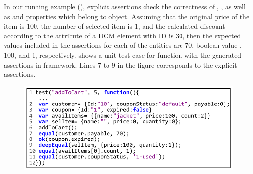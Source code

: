 In our running example (), explicit assertions check the correctness of , , as well as  and  properties which belong to  object.
Assuming that the original price of the item is 100, the number of selected item is 1, and the calculated discount according to the  attribute of a DOM element with ID  is 30, then the expected values included in the assertions for each of the entities are 70, boolean value , 100, and 1, respectively.  shows a unit test case for  function with the generated assertions in \qunit framework. %
Lines 7 to 9 in the figure corresponds to the explicit assertions.
\begin{figure}
  \centering
  \includegraphics[width=0.8\hsize]{fig/unitTest}
   \vspace{0.2in} 
  \label{Fig:unitTest}
\end{figure}  
